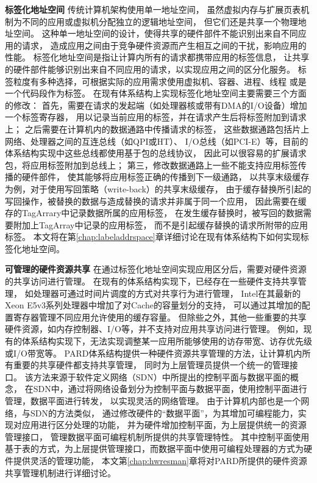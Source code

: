 \textbf{标签化地址空间}\quad
传统计算机架构使用单一地址空间，
虽然虚拟内存与扩展页表机制为不同的应用或虚拟机分配独立的逻辑地址空间，
但它们还是共享一个物理地址空间。
这种单一地址空间的设计，使得共享的硬件部件不能识别出来自不同应用的请求，
造成应用之间由于竞争硬件资源而产生相互之间的干扰，影响应用的性能。
标签化地址空间是指让计算内所有的请求都携带应用的标签信息，
让共享的硬件部件能够识别出来自不同应用的请求，以实现应用之间的区分化服务。
标签粒度有多种选择，可根据实际的应用需求使用虚拟机、容器、进程、线程
或是一个代码段作为标签。
在现有体系结构上实现标签化地址空间主要需要三个方面的修改：
首先，需要在请求的发起端（如处理器核或带有DMA的I/O设备）增加一个标签寄存器，
用以记录当前应用的标签，并在请求产生后将标签附加到请求上；
之后需要在计算机内的数据通路中传播请求的标签，
这些数据通路包括片上网络、处理器之间的互连总线（如QPI\cite{intel-qpi-spec}或HT\cite{ht-spec}）、
I/O总线（如PCI-E\cite{pcisig_pcie_spec}）等，目前的体系结构实现中这些总线都使用基于包的总线协议，
因此可以很容易的扩展请求包，将应用标签附加到总线上；
第三，修改数据通路上一些不能支持应用标签传播的硬件部件，
使其能够将应用标签正确的传播到下一级通路，
以共享末级缓存为例，对于使用写回策略（write-back）的共享末级缓存，
由于缓存替换所引起的写回操作，被替换的数据与造成替换的请求并非属于同一个应用，
因此需要在缓存的TagArrary中记录数据所属的应用标签，
在发生缓存替换时，被写回的数据需要附加上TagArray中记录的应用标签，
而不是引起缓存替换的请求所附带的应用标签。
本文将在第\ref{chap:labeladdrspace}章详细讨论在现有体系结构下如何实现标签化地址空间。


\textbf{可管理的硬件资源共享}\quad
在通过标签化地址空间实现应用区分后，需要对硬件资源的共享访问进行管理。
在现有的体系结构实现下，已经存在一些硬件支持共享管理，
如处理器可通过时间片调度的方式对共享行为进行管理，
Intel在其最新的Xeon E5v3系列处理器中增加了对Cache的容量划分的支持\cite{intel-cat}，
可以通过其增加的配置寄存器管理不同应用允许使用的缓存容量。
但除些之外，其他一些重要的共享硬件资源，如内存控制器、I/O等，并不支持对应用共享访问进行管理。
例如，现有的体系结构实现下，无法实现调整某一应用所能够使用的访存带宽、访存优先级或I/O带宽等。
PARD体系结构提供一种硬件资源共享管理的方法，让计算机内所有重要的共享硬件都支持共享管理，
同时为上层管理员提供一个统一的管理接口。
该方法来源于软件定义网络（SDN）中所提出的控制平面与数据平面的概念，
在SDN中，通过将网络设备划分为控制平面与数据平面，使用控制平面进行管理，数据平面进行转发，
以实现灵活的网络管理。
由于计算机内部也是一个网络，与SDN的方法类似，
通过修改硬件的``数据平面''，为其增加可编程能力，实现对应用进行区分处理的功能，
并为硬件增加控制平面，为上层提供统一的资源管理接口，
管理数据平面可编程机制所提供的共享管理特性。
其中控制平面使用基于表的方式，为上层提供管理接口，而数据平面中使用可编程处理器的方式为硬件提供灵活的管理功能，
本文第\ref{chap:hwresman}章将对PARD所提供的硬件资源共享管理机制进行详细讨论。


